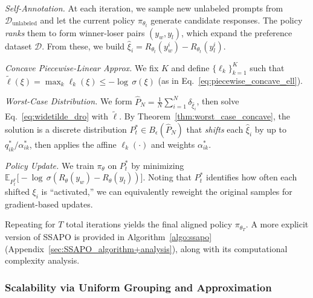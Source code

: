 \begin{compactenum}
\item \emph{Self-Annotation.}  
  At each iteration, we sample new unlabeled prompts from 
  $\mathcal{D}_{\mathrm{unlabeled}}$ and let the current policy 
  $\pi_{\theta_t}$ generate candidate responses.  The policy \emph{ranks} them 
  to form winner-loser pairs $(y_w,y_l)$, which expand the preference dataset 
  $\mathcal{D}$.  From these, we build $\hat{\xi}_i = R_{\theta_t}(y_w^i) - R_{\theta_t}(y_l^i)$.

\item \emph{Concave Piecewise-Linear Approx.}  
  We fix $K$ and define $\{\ell_k\}_{k=1}^K$ such that 
  $\widetilde{\ell}(\xi) = \max_k \ell_k(\xi)\le -\!\log\,\sigma(\xi)$ 
  (as in Eq.~\eqref{eq:piecewise_concave_ell}).  

\item \emph{Worst-Case Distribution.}  
  We form $\hat{P}_N=\tfrac1N\sum_{i=1}^N \delta_{\hat{\xi}_i}$, 
  then solve Eq.~\eqref{eq:widetilde_dro} with $\widetilde{\ell}$.  
  By Theorem~\ref{thm:worst_case_concave}, the solution is a discrete distribution 
  $P^*_t \in B_\epsilon(\hat{P}_N)$ that \emph{shifts} each $\hat{\xi}_i$ 
  by up to $q_{ik}^{*}/\alpha_{ik}^{*}$, then applies the affine $\ell_k(\cdot)$ 
  and weights $\alpha_{ik}^{*}$.  

\item \emph{Policy Update.}  
  We train $\pi_{\theta}$ on $P^*_t$ by minimizing 
  $\mathbb{E}_{P^*_t}\bigl[-\!\log\,\sigma(R_\theta(y_w)-R_\theta(y_l))\bigr]$.  
  Noting that $P^*_t$ identifies how often each shifted $\xi_i$ is “activated,” 
  we can equivalently reweight the original samples for gradient-based updates.
\end{compactenum}

Repeating for $T$ total iterations yields the final aligned policy $\pi_{\theta_T}$. A more explicit version of SSAPO is provided in Algorithm~\ref{algo:ssapo} (Appendix~\ref{sec:SSAPO_algorithm+analysis}), along with its computational complexity analysis.

\subsubsection{Scalability via Uniform Grouping and Approximation}
\label{subsec:discussion_approx}

